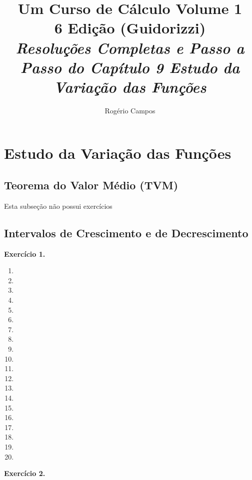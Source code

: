 \documentclass[12pt,a4paper]{article}
\title{
    \Huge \textbf{Um Curso de Cálculo Volume 1} \\
    \vspace{0.3cm}
    \Large 6\textordfeminine{} Edição (Guidorizzi) \\
    \vspace{0.5cm}
    \large \textit{Resoluções Completas e Passo a Passo do Capítulo 9 Estudo da Variação das Funções}
}
\author{Rogério Campos}
\begin{document}
\maketitle
\newpage

\tableofcontents
\newpage

\setcounter{section}{8}
\setcounter{subsection}{0}

\section{Estudo da Variação das Funções}

\subsection{Teorema do Valor Médio (TVM)}
Esta subseção não possui exercícios

\subsection{Intervalos de Crescimento e de Decrescimento}

\vspace{0.5cm}
\noindent\textbf{Exercício 1.}
\begin{enumerate}
    \renewcommand{\theenumi}{\alph{enumi}}
    \renewcommand{\labelenumi}{\theenumi)}
    \item 
    \item 
    \item 
    \item 
    \item 
    \item 
    \item 
    \item 
    \item 
    \item 
    \item 
    \item 
    \item 
    \item 
    \item 
    \item 
    \item 
    \item 
    \item 
    \item 
\end{enumerate}

\vspace{0.5cm}
\noindent\textbf{Exercício 2.}
\end{document}
